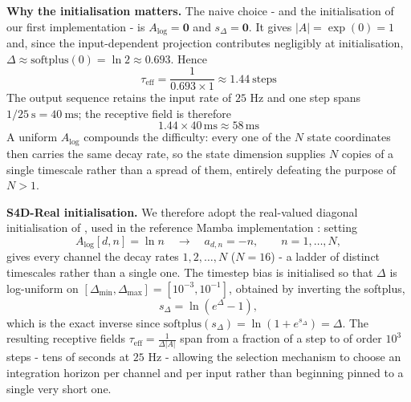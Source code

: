 \documentclass[10pt,a4paper,twocolumn]{article}
\begin{document}
		\textbf{Why the initialisation matters.} The naive choice - and the initialisation of our first implementation - is $A_{\log} = \mathbf{0}$ and $s_\Delta = \mathbf{0}$. It gives $|A| = \exp(0) = 1$ and, since the input-dependent projection contributes negligibly at initialisation, $\Delta \approx \text{softplus}(0) = \ln 2 \approx 0.693$. Hence $$\tau_{\text{eff}} = \frac{1}{0.693 \times 1} \approx 1.44 \ \text{steps}$$ The output sequence retains the input rate of $25$ Hz and one step spans $1/25 \ \text{s} = 40 \ \text{ms}$; the receptive field is therefore $$1.44 \times 40\,\text{ms} \approx 58\,\text{ms}$$ A uniform $A_{\log}$ compounds the difficulty: every one of the $N$ state coordinates then carries the same decay rate, so the state dimension supplies $N$ copies of a single timescale rather than a spread of them, entirely defeating the purpose of $N > 1$.

		\textbf{S4D-Real initialisation.} We therefore adopt the real-valued diagonal initialisation of \cite{gu2022s4d}, used in the reference Mamba implementation \cite{gu2023mamba}: setting $$A_{\log}[d, n] = \ln n \quad \rightarrow \quad a_{d,n} = -n, \qquad n = 1,\dots, N,$$ gives every channel the decay rates $1, 2, \dots, N$ ($N = 16$) - a ladder of distinct timescales rather than a single one. The timestep bias is initialised so that $\Delta$ is log-uniform on $[\Delta_{\min},\Delta_{\max}] = [10^{-3}, 10^{-1}]$, obtained by inverting the softplus, $$s_\Delta = \ln \left(e^{\Delta} - 1\right),$$ which is the exact inverse since $\text{softplus}(s_\Delta) = \ln(1+e^{s_\Delta}) = \Delta$. The resulting receptive fields $\tau_{\text{eff}} = \frac{1}{\Delta|A|}$ span from a fraction of a step to of order $10^3$ steps - tens of seconds at $25$ Hz - allowing the selection mechanism to choose an integration horizon per channel and per input rather than beginning pinned to a single very short one.
\end{document}
